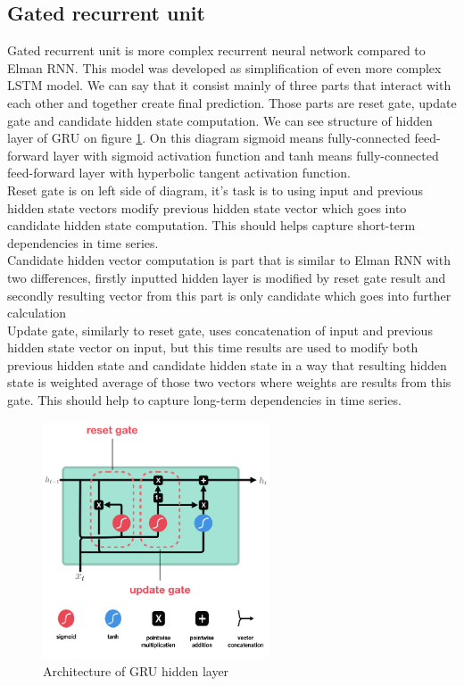 \subsection{Gated recurrent unit}
 
Gated recurrent unit is more complex recurrent neural network compared to Elman RNN. This model was developed as simplification of even more complex LSTM model. We can say that it consist mainly of three parts that interact with each other and together create final prediction. Those parts are reset gate, update gate and candidate hidden state computation. We can see structure of hidden layer of GRU on figure \ref{fig:gru_arch}. On this diagram sigmoid means fully-connected feed-forward layer with sigmoid activation function and tanh means fully-connected feed-forward layer with hyperbolic tangent activation function.
\\

Reset gate is on left side of diagram, it's task is to using input and previous hidden state vectors modify previous hidden state vector which goes into candidate hidden state computation. This should helps capture short-term dependencies in time series.
\\

Candidate hidden vector computation is part that is similar to Elman RNN with two differences, firstly inputted hidden layer is modified by reset gate result and secondly resulting vector from this part is only candidate which goes into further calculation
\\

Update gate, similarly to reset gate, uses concatenation of input and previous hidden state vector on input, but this time results are used to modify both previous hidden state and candidate hidden state in a way that resulting hidden state is weighted average of those two vectors where weights are results from this gate. This should help to capture long-term dependencies in time series. 
\\ 

\begin{figure}[!h]
	\centering
	
	\includegraphics[width=0.6\textwidth]{images/GRU_arch.png}
	
	\caption{Architecture of GRU hidden layer}
	\label{fig:gru_arch}
\end{figure}
 
